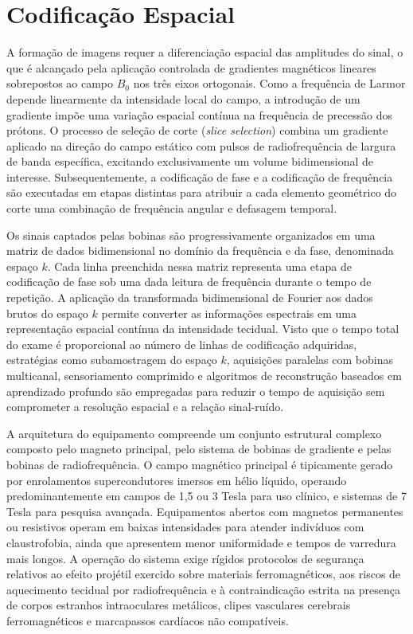 \documentclass[a4paper,12pt,oneside,openright]{abntex2}
\begin{document}
\section{Codificação Espacial}

A formação de imagens requer a diferenciação espacial das amplitudes do sinal, o que é alcançado pela aplicação controlada de gradientes magnéticos lineares sobrepostos ao campo $B_0$ nos três eixos ortogonais. Como a frequência de Larmor depende linearmente da intensidade local do campo, a introdução de um gradiente impõe uma variação espacial contínua na frequência de precessão dos prótons. O processo de seleção de corte (\textit{slice selection}) combina um gradiente aplicado na direção do campo estático com pulsos de radiofrequência de largura de banda específica, excitando exclusivamente um volume bidimensional de interesse. Subsequentemente, a codificação de fase e a codificação de frequência são executadas em etapas distintas para atribuir a cada elemento geométrico do corte uma combinação de frequência angular e defasagem temporal.

Os sinais captados pelas bobinas são progressivamente organizados em uma matriz de dados bidimensional no domínio da frequência e da fase, denominada espaço $k$. Cada linha preenchida nessa matriz representa uma etapa de codificação de fase sob uma dada leitura de frequência durante o tempo de repetição. A aplicação da transformada bidimensional de Fourier aos dados brutos do espaço $k$ permite converter as informações espectrais em uma representação espacial contínua da intensidade tecidual. Visto que o tempo total do exame é proporcional ao número de linhas de codificação adquiridas, estratégias como subamostragem do espaço $k$, aquisições paralelas com bobinas multicanal, sensoriamento comprimido e algoritmos de reconstrução baseados em aprendizado profundo são empregadas para reduzir o tempo de aquisição sem comprometer a resolução espacial e a relação sinal-ruído.

A arquitetura do equipamento compreende um conjunto estrutural complexo composto pelo magneto principal, pelo sistema de bobinas de gradiente e pelas bobinas de radiofrequência. O campo magnético principal é tipicamente gerado por enrolamentos supercondutores imersos em hélio líquido, operando predominantemente em campos de 1,5 ou 3 Tesla para uso clínico, e sistemas de 7 Tesla para pesquisa avançada. Equipamentos abertos com magnetos permanentes ou resistivos operam em baixas intensidades para atender indivíduos com claustrofobia, ainda que apresentem menor uniformidade e tempos de varredura mais longos. A operação do sistema exige rígidos protocolos de segurança relativos ao efeito projétil exercido sobre materiais ferromagnéticos, aos riscos de aquecimento tecidual por radiofrequência e à contraindicação estrita na presença de corpos estranhos intraoculares metálicos, clipes vasculares cerebrais ferromagnéticos e marcapassos cardíacos não compatíveis.
\end{document}
